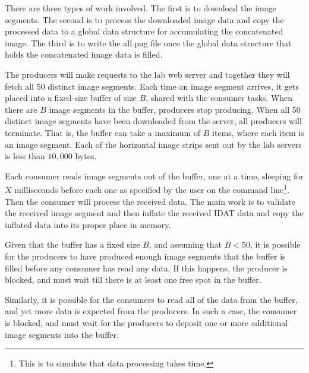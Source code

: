 There are three types of work involved. The first  is to download the image segments. The second is to process the downloaded image data and copy the processed data to a global data structure for accumulating the concatenated image. The third is to write the all.png file once the global data structure that holds the concatenated image data is filled.

The producers will make requests to the lab web server and together they will fetch all 50 distinct image segments. Each time an image segment arrives, it gets placed into a fixed-size buffer of size $B$, 
shared with the consumer tasks. When there are $B$ image segments in the buffer, producers stop producing. When all 50 distinct image segments have been downloaded from the server, all producers will terminate. That is, the buffer can take a maximum of $B$ items, where each item is an image segment. Each of the horizontal image strips sent out by the lab servers is less than $10,000$ bytes. 

Each consumer reads image segments out of the buffer, one at a time, sleeping for $X$ milliseconds before each one as specified by the user on the command line\footnote{This is to simulate that data processing takes time.}. Then the consumer will process the received data. The main work is to validate the received image segment and then inflate the received IDAT data and copy the inflated data into its proper place in memory. 

Given that the buffer has a fixed size $B$, and assuming that $B < 50$, it is possible for the producers to have produced enough image segments that the buffer is filled before any consumer has read any data.  If this happens, the producer is blocked, and must wait till there is at least one free spot in the buffer.  

Similarly, it is possible for the consumers to read all of the data from the buffer, and yet more data is expected from the producers.  In such a case, the consumer is blocked, and must wait for the producers to deposit one or more additional image segments into the buffer.  

